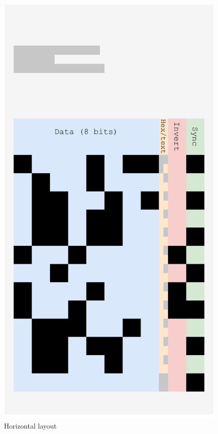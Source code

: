 \documentclass{article}
\begin{document}
\begin{landscape}
\begin{figure}[h]
				\includegraphics[width=\linewidth]{img/horizontal}
				\caption{Horizontal layout}
				\label{fig:horizontal}
			\endminipage\hfill

\end{figure}
\end{landscape}
\end{document}

